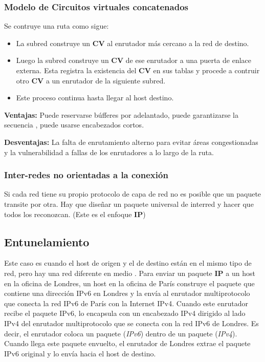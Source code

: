 	\subsubsection{Modelo de Circuitos virtuales concatenados}
	Se contruye una ruta como sigue:
	\begin{itemize}
		\item La subred construye un \textbf{CV} al enrutador más cercano a la red de destino.
		\item Luego la subred construye un \textbf{CV} de ese enrutador a una puerta de enlace externa. Esta registra la existencia del \textbf{CV} en sus tablas y procede a contruir otro \textbf{CV} a un enrutador de la siguiente subred.
		\item Este proceso continua hasta llegar al host destino.
	\end{itemize}

	\par \textbf{Ventajas:} Puede reservarse búfferes por adelantado, puede garantizarse la secuencia , puede usarse encabezados cortos.
	\par \textbf{Desventajas:} La falta de enrutamiento alterno para evitar áreas congestionadas y la vulnerabilidad a fallas de los enrutadores a lo largo de la ruta.

	\subsubsection{Inter-redes no orientadas a la conexión}
	Si cada red tiene su propio protocolo de capa de red no es posible que un paquete transite por otra. Hay que diseñar un paquete universal de interred y hacer que todos los reconozcan. (Este es el enfoque \textbf{IP})

	\subsection{Entunelamiento}
	Este caso es cuando el host de origen y el de destino están en el mismo tipo de red, pero hay una red diferente en medio	.
	Para enviar un paquete \textbf{IP} a un host en la oficina de Londres, un host en la oficina de París construye el paquete que contiene
una dirección IPv6 en Londres y la envía al enrutador multiprotocolo que conecta la red IPv6 de París con
la Internet IPv4. Cuando este enrutador recibe el paquete IPv6, lo encapsula con un encabezado IPv4 dirigido al lado IPv4 del enrutador multiprotocolo que se conecta con la red IPv6 de Londres. Es decir, el
enrutador coloca un paquete (\textit{IPv6}) dentro de un paquete (\textit{IPv4}). Cuando llega este paquete envuelto,
el enrutador de Londres extrae el paquete IPv6 original y lo envía hacia el host de destino.


